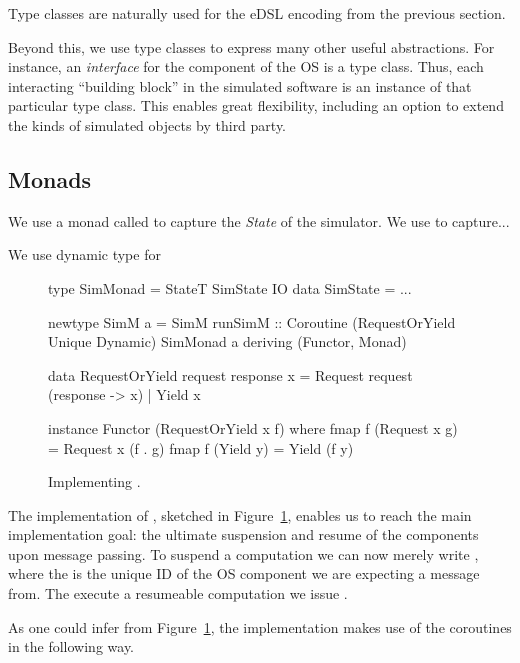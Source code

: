 Type classes are naturally used for the eDSL encoding from the
previous section.  

Beyond this, we use type classes to express many
other useful abstractions. For instance, an \emph{interface} for the
component of the OS is a type class. Thus, each interacting ``building
block'' in the simulated software is an instance of that particular
type class. This enables great flexibility, including an option to
extend the kinds of simulated objects by third party.

\subsection{Monads}

We use a monad called  to capture the \emph{State}
 of the simulator. We use
 to capture...

We use dynamic type for 

\begin{figure}
\centering
\begin{code*}
type SimMonad  = StateT SimState IO
data SimState = ...

newtype SimM a 
  = SimM { runSimM :: Coroutine 
      (RequestOrYield Unique Dynamic) 
      SimMonad a }
    deriving (Functor, Monad)

data RequestOrYield request response x
  = Request request (response -> x)
  | Yield   x

instance Functor (RequestOrYield x f) where
  fmap f (Request x g) = Request x (f . g)
  fmap f (Yield y)     = Yield (f y)
\end{code*}
\caption{Implementing .}
\label{fig:code-simm}
\end{figure}

The implementation of , sketched in
Figure~\ref{fig:code-simm}, enables us to reach the main
implementation goal: the ultimate suspension and resume of the
components upon message passing.  To suspend a computation we can now
merely write , where the  is
the unique ID of the OS component we are expecting a message from. The
execute a resumeable computation we issue .

As one could infer from Figure~\ref{fig:code-simm}, the implementation
makes use of the coroutines in the following way. 


